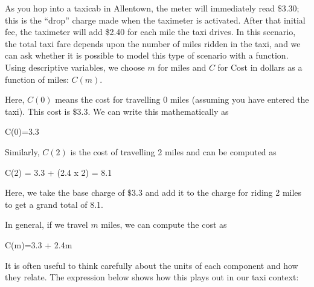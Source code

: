 \documentclass[
  letterpaper,
  DIV=11,
  numbers=noendperiod]{scrreprt}
\newenvironment{Shaded}{\begin{snugshade}}{\end{snugshade}}
\newcommand{\DataTypeTok}[1]{\textcolor[rgb]{0.68,0.00,0.00}{#1}}
\newcommand{\ErrorTok}[1]{\textcolor[rgb]{0.68,0.00,0.00}{#1}}
\newcommand{\FloatTok}[1]{\textcolor[rgb]{0.68,0.00,0.00}{#1}}
\newcommand{\KeywordTok}[1]{\textcolor[rgb]{0.00,0.23,0.31}{#1}}
\newcommand{\OperatorTok}[1]{\textcolor[rgb]{0.37,0.37,0.37}{#1}}
\begin{document}
As you hop into a taxicab in Allentown, the meter will immediately read
\$3.30; this is the ``drop'' charge made when the taximeter is
activated. After that initial fee, the taximeter will add \$2.40 for
each mile the taxi drives. In this scenario, the total taxi fare depends
upon the number of miles ridden in the taxi, and we can ask whether it
is possible to model this type of scenario with a function. Using
descriptive variables, we choose \(m\) for miles and \(C\) for Cost in
dollars as a function of miles: \(C(m)\).

Here, \(C(0)\) means the cost for travelling 0 miles (assuming you have
entered the taxi). This cost is \(\$3.3\). We can write this
mathematically as

\begin{Shaded}
\begin{Highlighting}[]
\DataTypeTok{C}\ErrorTok{(}\DataTypeTok{0}\ErrorTok{)}\OperatorTok{=}\FloatTok{3.3}
\end{Highlighting}
\end{Shaded}

Similarly, \(C(2)\) is the cost of travelling 2 miles and can be
computed as

\begin{Shaded}
\begin{Highlighting}[]
\DataTypeTok{C}\ErrorTok{(}\DataTypeTok{2}\ErrorTok{)} \OperatorTok{=} \FloatTok{3.3} \ErrorTok{+} \ErrorTok{(}\DataTypeTok{2}\KeywordTok{.}\DataTypeTok{4} \DataTypeTok{x} \DataTypeTok{2}\ErrorTok{)} \OperatorTok{=} \FloatTok{8.1}
\end{Highlighting}
\end{Shaded}

Here, we take the base charge of \(\$3.3\) and add it to the charge for
riding 2 miles to get a grand total of 8.1.

In general, if we travel \(m\) miles, we can compute the cost as

\begin{Shaded}
\begin{Highlighting}[]
\DataTypeTok{C}\ErrorTok{(}\DataTypeTok{m}\ErrorTok{)}\OperatorTok{=}\FloatTok{3.3} \ErrorTok{+} \DataTypeTok{2}\KeywordTok{.}\DataTypeTok{4m}
\end{Highlighting}
\end{Shaded}

It is often useful to think carefully about the units of each component
and how they relate. The expression below shows how this plays out in
our taxi context:
\end{document}
